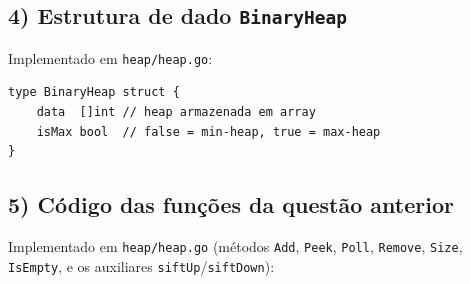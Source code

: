 \documentclass[11pt,a4paper]{article}
\begin{document}
\subsection*{4) Estrutura de dado \texttt{BinaryHeap}}
Implementado em \texttt{heap/heap.go}:
\begin{lstlisting}
type BinaryHeap struct {
    data  []int // heap armazenada em array
    isMax bool  // false = min-heap, true = max-heap
}
\end{lstlisting}

\subsection*{5) Código das funções da questão anterior}
Implementado em \texttt{heap/heap.go} (métodos \texttt{Add}, \texttt{Peek}, \texttt{Poll},
\texttt{Remove}, \texttt{Size}, \texttt{IsEmpty}, e os auxiliares \texttt{siftUp}/\texttt{siftDown}):
\end{document}
